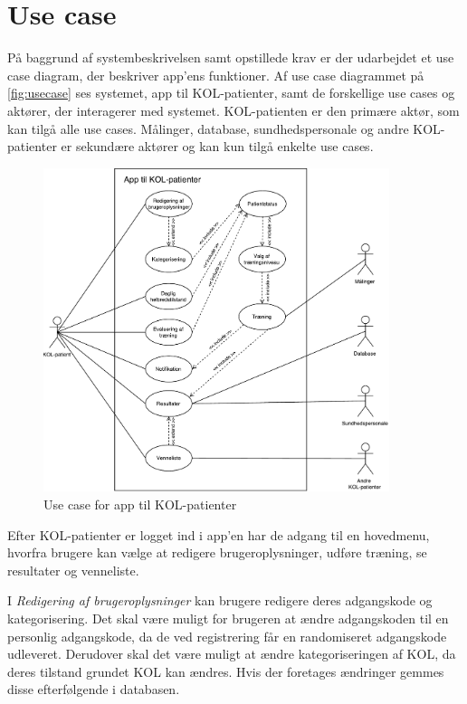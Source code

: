 \section{Use case} \label{sec:usecase} 
På baggrund af systembeskrivelsen samt opstillede krav er der udarbejdet et use case diagram, der beskriver app'ens funktioner. Af use case diagrammet på \autoref{fig:usecase} ses systemet, app til KOL-patienter, samt de forskellige use cases og aktører, der interagerer med systemet. KOL-patienten er den primære aktør, som kan tilgå alle use cases. Målinger, database, sundhedspersonale og andre KOL-patienter er sekundære aktører og kan kun tilgå enkelte use cases. 

\begin{figure} [H]
\centering
\includegraphics[width=0.9\textwidth]{figures/aktivitetsdiagram/Usecase}
\caption{Use case for app til KOL-patienter}
\label{fig:usecase}
\end{figure}

\noindent
Efter KOL-patienter er logget ind i app'en har de adgang til en hovedmenu, hvorfra brugere kan vælge at redigere brugeroplysninger, udføre træning, se resultater og venneliste. 

I \textit{Redigering af brugeroplysninger} kan brugere redigere deres adgangskode og kategorisering. Det skal være muligt for brugeren at ændre adgangskoden til en personlig adgangskode, da de ved registrering får en randomiseret adgangskode udleveret. Derudover skal det være muligt at ændre kategoriseringen af KOL, da deres tilstand grundet KOL kan ændres. Hvis der foretages ændringer gemmes disse efterfølgende i databasen. 

